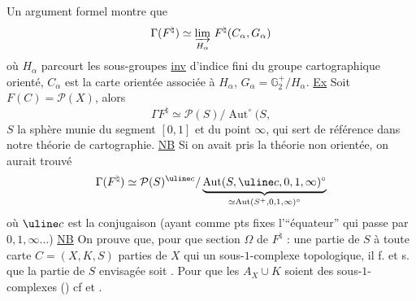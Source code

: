 Un argument  formel montre que
\[
\Gamma(F^\natural)\simeq\underset{H_\alpha}{\varinjlim}\ F^\natural(C_\alpha,G_\alpha)
\]
où $H_\alpha$ parcourt les sous-groupes \uline{inv} d’indice fini du groupe cartographique orienté, $C_\alpha$ est la carte orientée associée à $H_\alpha$, $G_\alpha=\mathbb G_2^+/H_\alpha$.
\uline{Ex} Soit $F(C)=\mathcal P(X)$, alors
\[
\Gamma F^\natural\simeq\mathcal P(S)/\operatorname{Aut}^\circ(S,
\]
$S$  la sphère munie du segment $[0,1]$ et du point $\infty$,
 qui sert de référence dans notre théorie de cartographie.
\uline{NB} Si on avait pris la théorie non orientée, on aurait trouvé
\[
\Gamma(F^\natural)\simeq\mathcal P(S)^{\uline c}/
\underbrace{\operatorname{Aut}(S,\uline c,0,1,\infty)^\circ}_{\simeq\operatorname{Aut}(S^+,0,1,\infty)^\circ}
\]
où $\uline c$ est la conjugaison (ayant comme pts fixes l’``équateur'' qui passe par $0,1,\infty\ldots$)
\uline{NB} On prouve  que, pour que  section $\Omega$ de $F^\natural$ : une partie  de $S$   à toute carte $C=(X,K,S)$  parties  de $X$ qui  un sous-$1$-complexe topologique, il f. et s. que la partie de $S$ envisagée soit .
Pour que les $A_X\cup K$ soient des sous-$1$-complexes () cf\unsure{]} et .
